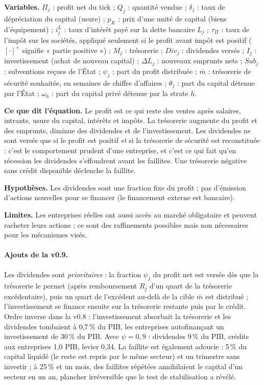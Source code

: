 \documentclass[11pt,a4paper]{article}
\newcommand{\variables}{\par\noindent\textbf{Variables.} }
\newcommand{\sens}{\par\noindent\textbf{Ce que dit l'équation.} }
\newcommand{\hyp}{\par\noindent\textbf{Hypothèses.} }
\newcommand{\limites}{\par\noindent\textbf{Limites.} }
\newcommand{\pos}[1]{{\left[#1\right]^{+}}}
\begin{document}
\begin{lecture}
\variables $\Pi_j$ : profit net du tick ; $Q_j$ : quantité vendue ; $\delta_j$ : taux de dépréciation du capital (usure) ; $p_K$ : prix d'une unité de capital (biens d'équipement) ; $i^L_j$ : taux d'intérêt payé sur la dette bancaire $L_j$ ; $\tau_\Pi$ : taux de l'impôt sur les sociétés, appliqué seulement si le profit avant impôt est positif ($\pos{\cdot}$ signifie « partie positive ») ; $M_j$ : trésorerie ; $Div_j$ : dividendes versés ; $I_j$ : investissement (achat de nouveau capital) ; $\Delta L_j$ : nouveaux emprunts nets ; $Sub_j$ : subventions reçues de l'État ; $\psi_j$ : part du profit distribuée ; $\bar m$ : trésorerie de sécurité souhaitée, en semaines de chiffre d'affaires ; $\theta_j$ : part du capital détenue par l'État ; $\omega_h$ : part du capital privé détenue par la strate $h$.
\sens Le profit est ce qui reste des ventes après salaires, intrants, usure du capital, intérêts et impôts. La trésorerie augmente du profit et des emprunts, diminue des dividendes et de l'investissement. Les dividendes ne sont versés que si le profit est positif \emph{et} si la trésorerie de sécurité est reconstituée : c'est le comportement prudent d'une entreprise, et c'est ce qui fait qu'en récession les dividendes s'effondrent avant les faillites. Une trésorerie négative sans crédit disponible déclenche la faillite.
\hyp Les dividendes sont une fraction fixe du profit ; pas d'émission d'actions nouvelles pour se financer (le financement externe est bancaire).
\limites Les entreprises réelles ont aussi accès au marché obligataire et peuvent racheter leurs actions ; ce sont des raffinements possibles mais non nécessaires pour les mécanismes visés.
\paragraph{Ajouts de la v0.9.} Les dividendes sont \emph{prioritaires} : la fraction $\psi_j$ du profit net est versée dès que la trésorerie le permet (après remboursement $R_j$ d'un quart de la trésorerie excédentaire), puis un quart de l'excédent au-delà de la cible $\bar m$ est distribué ; l'investissement se finance ensuite sur la trésorerie restante puis par le crédit. Ordre inverse dans la v0.8 : l'investissement absorbait la trésorerie et les dividendes tombaient à 0,7\,\% du PIB, les entreprises autofinançant un investissement de 30\,\% du PIB. Avec $\psi=0{,}9$ : dividendes 9\,\% du PIB, crédits aux entreprises 1,0 PIB, levier 0,34. La faillite est également adoucie : 5\,\% du capital liquidé (le reste est repris par le même secteur) et un trimestre sans investir ; à 25\,\% et un mois, des faillites répétées annihilaient le capital d'un secteur en un an, plancher irréversible que le test de stabilisation a révélé.
\end{lecture}
\end{document}
